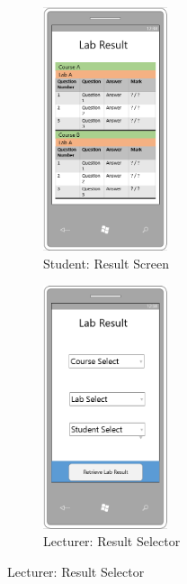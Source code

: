 \documentclass[12pt]{article}  %
\begin{document}
\begin{figure}[H]
\caption{Results Page: Mobile Designs}
\label{fig:result-mb}
\centering
\begin{subfigure}[c]{0.3\textwidth}
    \centering
    \includegraphics[width=0.4\textwidth]{images/design/result-student-mobile.png}
    \caption{Student: Result Screen}
    \label{fig:design-result-student-mb}
\end{subfigure}
\hfill
\begin{subfigure}[c]{0.3\textwidth}
    \centering
    \includegraphics[width=0.4\textwidth]{images/design/result-select-mobile.png}
    \caption{Lecturer: Result Selector}

\end{subfigure}
\end{figure}
\end{document}

